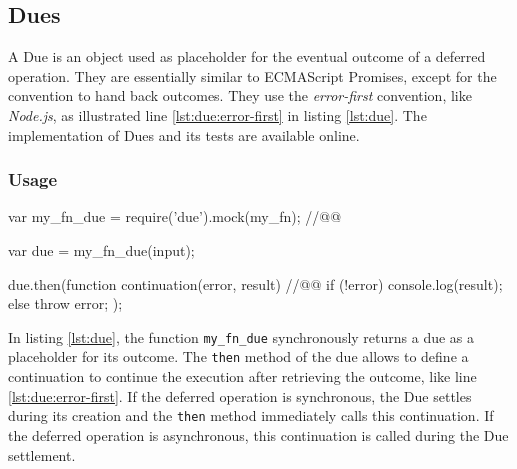 
\subsection{Dues} \label{chapter5:due:definition}

A Due is an object used as placeholder for the eventual outcome of a deferred operation.
They are essentially similar to ECMAScript Promises, except for the convention to hand back outcomes.
They use the \textit{error-first} convention, like \textit{Node.js}, as illustrated line \ref{lst:due:error-first} in listing \ref{lst:due}.
The implementation of Dues and its tests are available online.

\subsubsection{Usage}

\begin{code}[js, %
             caption={Example of a due}, %
             label={lst:due}] %
var my_fn_due = require('due').mock(my_fn); //@\label{lst:due:mock}@

var due = my_fn_due(input);

due.then(function continuation(error, result) { //@\label{lst:due:error-first}@
  if (!error) {
    console.log(result);
  } else {
    throw error;
  }
});
\end{code}


In listing \ref{lst:due}, the function \texttt{my\_fn\_due} synchronously returns a due as a placeholder for its outcome.
The \texttt{then} method of the due allows to define a continuation to continue the execution after retrieving the outcome, like line \ref{lst:due:error-first}.
If the deferred operation is synchronous, the Due settles during its creation and the \texttt{then} method immediately calls this continuation.
If the deferred operation is asynchronous, this continuation is called during the Due settlement.

